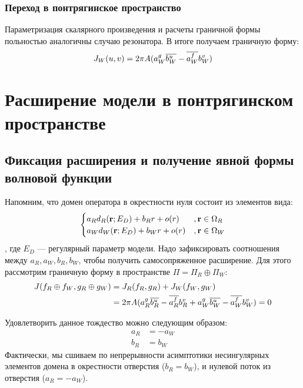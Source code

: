 \subsubsection{Переход в понтрягинское пространство}
Параметризация скалярного произведения и расчеты граничной формы польностью аналогичны случаю резонатора. В итоге получаем граничную форму:
\begin{align*}
J_W(u, v) = 2 \pi A (a_W^g \overline{b_W^u} - \overline{a_W^f} b_W^v)
\end{align*}

\section{Расширение модели в понтрягинском пространстве}
\subsection{Фиксация расширения и получение явной формы волновой функции}

Напомним, что домен оператора в окрестности нуля состоит из элементов вида:
\[
\begin{cases}
a_R d_R(\vb{r}; E_D) + b_R r + o(r)  &, \vb{r} \in \Omega_R \\
a_W d_W(\vb{r}; E_D) + b_W r + o(r)  &, \vb{r} \in \Omega_W \\
\end{cases}
\], где $E_D$ — регулярный параметр модели. Надо зафиксировать соотношения между $a_R, a_W, b_R, b_W$, чтобы получить самосопряженное расширение. Для этого рассмотрим граничную форму в пространстве $\Pi = \Pi_R \oplus \Pi_W$:
\begin{align*}
J(f_R \oplus f_W, g_R \oplus g_W)
&= J_R(f_R, g_R) + J_W(f_W, g_W) \\
&= 2 \pi A (a_R^g \overline{b_R^u} - \overline{a_R^f} b_R^v  + a_W^g \overline{b_W^u} - \overline{a_W^f} b_W^v)  = 0
\end{align*}

Удовлетворить данное тождество можно следующим образом:
\begin{align*}
a_R &= -a_W \\
b_R &= b_W
\end{align*}
Фактически, мы сшиваем по непрерывности асимптотики несингулярных элементов домена в окрестности отверстия ($b_R = b_W$), и нулевой поток из отверстия ($a_R = -a_W$).

